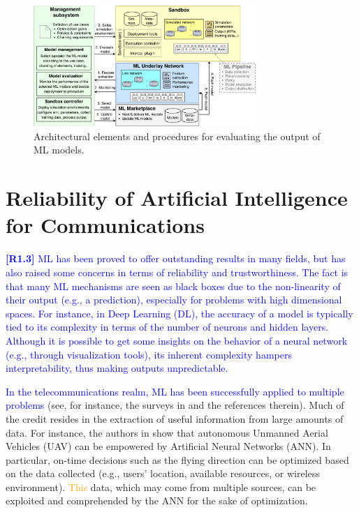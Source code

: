 \documentclass[journal]{IEEEtran}
\begin{document}
	\begin{figure}[ht!]
		\centering
		\includegraphics[width=0.75\textwidth]{architecture_example.pdf}
		\caption{Architectural elements and procedures for evaluating the output of ML models.}
		\label{fig:example_simulator}
	\end{figure}
		
	\section{Reliability of Artificial Intelligence for Communications}
	
	\textcolor{blue}{\textbf{[R1.3]} ML has been proved to offer outstanding results in many fields, but has also raised some concerns in terms of reliability and trustworthiness. The fact is that many ML mechanisms are seen as black boxes due to the non-linearity of their output (e.g., a prediction), especially for problems with high dimensional spaces. For instance, in Deep Learning (DL), the accuracy of a model is typically tied to its complexity in terms of the number of neurons and hidden layers. Although it is possible to get some insights on the behavior of a neural network (e.g., through visualization tools), its inherent complexity hampers interpretability, thus making outputs unpredictable.}
	
	\textcolor{blue}{In the telecommunications realm, ML has been successfully applied to multiple problems} (see, for instance, the surveys in \cite{survey2,survey3,survey4,survey5,survey6} and the references therein). Much of the credit resides in the extraction of useful information from large amounts of data. For instance, the authors in \cite{survey4} show that autonomous Unmanned Aerial Vehicles (UAV) can be empowered by Artificial Neural Networks (ANN). In particular, on-time decisions such as the flying direction can be optimized based on the data collected (e.g., users' location, available resources, or wireless environment). \textcolor{orange}{This} data, which may come from multiple sources, can be exploited and comprehended by the ANN for the sake of optimization.
	
\end{document}
